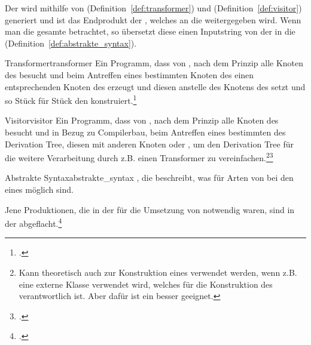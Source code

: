 
Der  wird mithilfe von  (Definition~\ref{def:transformer}) und  (Definition~\ref{def:visitor}) generiert und ist das Endprodukt der , welches an die  weitergegeben wird. Wenn man die gesamte  betrachtet, so übersetzt diese einen Inputstring von der  in die  (Definition~\ref{def:abstrakte_syntax}).

\begin{Definition}{Transformer}{transformer}
  Ein Programm, dass von , nach dem  Prinzip alle Knoten des  besucht und beim Antreffen eines bestimmten Knoten des  einen entsprechenden Knoten des  erzeugt und diesen anstelle des Knotens des  setzt und so Stück für Stück den  konstruiert.\footcite{noauthor_transformers_nodate}
\end{Definition}

\begin{Definition}{Visitor}{visitor}
  Ein Programm, dass von , nach dem  Prinzip alle Knoten des  besucht und in Bezug zu Compilerbau, beim Antreffen eines bestimmten  des Derivation Tree, diesen  mit anderen Knoten  oder , um den Derivation Tree für die weitere Verarbeitung durch z.B. einen Transformer zu vereinfachen.\footnote{Kann theoretisch auch zur Konstruktion eines  verwendet werden, wenn z.B. eine externe Klasse verwendet wird, welches für die Konstruktion des  verantwortlich ist. Aber dafür ist ein  besser geeignet.}\footcite{noauthor_transformers_nodate}
\end{Definition}

\begin{Definition}{Abstrakte Syntax}{abstrakte_syntax}
  , die beschreibt, was für Arten von  bei den  eines  möglich sind.

  Jene Produktionen, die in der  für die Umsetzung von  notwendig waren, sind in der  abgeflacht.\footcite{g_siek_course_2022}
\end{Definition}

